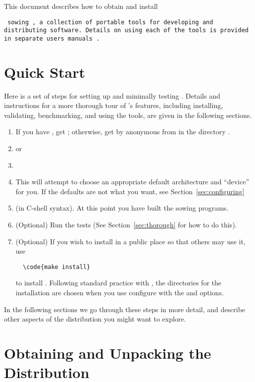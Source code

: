 This document describes how to obtain and install {\tt
  sowing~\cite{sowing}, a collection of portable tools for developing and
distributing software.  Details on using each of the tools is provided in
separate users manuals \cite{bfort,doctext,tohtml}.

\section{Quick Start}
\label{sec:quickstart}

Here is a set of steps for setting up and minimally testing .
Details and instructions for a more thorough tour of 's features,
including installing, validating, benchmarking, and using the tools, are given
in the following sections.  
\begin{enumerate}
\item If you have , get ; otherwise, get 
 by anonymous  from
   in the directory .
\item {} or 
\item {}
\item {}  This will attempt to choose an appropriate default
  architecture and ``device'' for you.  If the defaults are not what you want,
  see Section~\ref{sec:configuring}
\item {} (in C-shell syntax).  
At this point you have built the sowing programs.  
\item (Optional)  Run the tests
  (See Section~\ref{sec:thorough} for how to do this).  
\item (Optional)  If you wish to install  in a public place so
  that others may use it, use
\begin{verbatim}
  \code{make install}
\end{verbatim}
to install .  Following standard practice with ,
the directories for the installation are chosen when you use configure with
the  and  options.
\end{enumerate}

In the following
sections we go through these steps in more detail, and describe other aspects
of the  distribution you might want to explore.

\section{Obtaining and Unpacking the Distribution}
\label{sec:unpacking}

}

